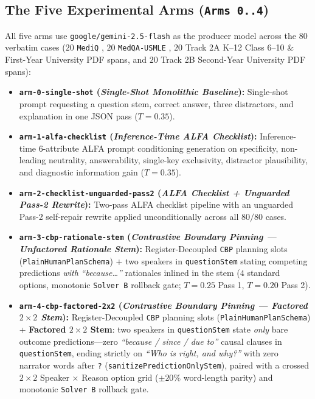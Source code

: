 \documentclass[11pt,a4paper]{article}
\begin{document}
\subsection{The Five Experimental Arms (\texttt{Arms 0..4})}
All five arms use \texttt{google/gemini-2.5-flash} as the producer model across the $80$ verbatim cases ($20$ \texttt{MediQ} \cite{li2024mediq}, $20$ \texttt{MedQA-USMLE} \cite{jin2021medqa}, $20$ Track 2A K--12 Class 6--10 \& First-Year University PDF spans, and $20$ Track 2B Second-Year University PDF spans):
\begin{itemize}
  \item \textbf{\texttt{arm-0-single-shot} (\emph{Single-Shot Monolithic Baseline}):} Single-shot prompt requesting a question stem, correct answer, three distractors, and explanation in one JSON pass ($T=0.35$).
  \item \textbf{\texttt{arm-1-alfa-checklist} (\emph{Inference-Time ALFA Checklist}):} Inference-time 6-attribute ALFA prompt \cite{li2025alfa} conditioning generation on specificity, non-leading neutrality, answerability, single-key exclusivity, distractor plausibility, and diagnostic information gain ($T=0.35$).
  \item \textbf{\texttt{arm-2-checklist-unguarded-pass2} (\emph{ALFA Checklist + Unguarded Pass-2 Rewrite}):} Two-pass ALFA checklist pipeline with an unguarded Pass-2 self-repair rewrite applied unconditionally across all $80/80$ cases.
  \item \textbf{\texttt{arm-3-cbp-rationale-stem} (\emph{Contrastive Boundary Pinning --- Unfactored Rationale Stem}):} Register-Decoupled \texttt{CBP} planning slots (\texttt{PlainHumanPlanSchema}) + two speakers in \texttt{questionStem} stating competing predictions \emph{with} \emph{``because\dots''} rationales inlined in the stem ($4$ standard options, monotonic \texttt{Solver B} rollback gate; $T=0.25$ Pass 1, $T=0.20$ Pass 2).
  \item \textbf{\texttt{arm-4-cbp-factored-2x2} (\emph{Contrastive Boundary Pinning --- Factored $2\times 2$ Stem}):} Register-Decoupled \texttt{CBP} planning slots (\texttt{PlainHumanPlanSchema}) + \textbf{Factored $2\times 2$ Stem}: two speakers in \texttt{questionStem} state \emph{only} bare outcome predictions---zero \emph{``because / since / due to''} causal clauses in \texttt{questionStem}, ending strictly on \emph{``Who is right, and why?''} with zero narrator words after \texttt{?} (\texttt{sanitizePredictionOnlyStem}), paired with a crossed $2\times 2$ Speaker $\times$ Reason option grid ($\pm 20\%$ word-length parity) and monotonic \texttt{Solver B} rollback gate.
\end{itemize}
\end{document}
